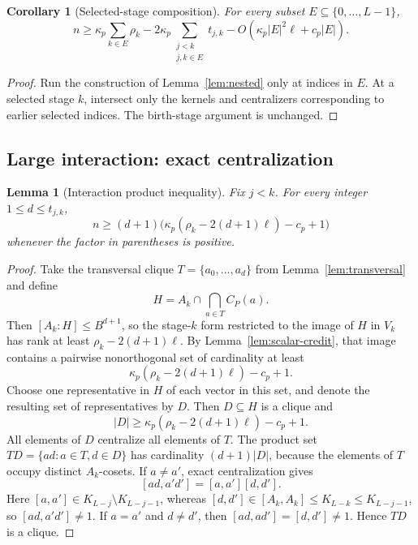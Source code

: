\documentclass[11pt]{article}
\newtheorem{lemma}[theorem]{Lemma}
\newtheorem{corollary}[theorem]{Corollary}
\theoremstyle{definition}
\theoremstyle{remark}
\begin{document}
\begin{corollary}[Selected-stage composition]\label{cor:selected}
For every subset $E\subseteq\{0,\ldots,L-1\}$,
\[
n\ge\kappa_p\sum_{k\in E}\rho_k-2\kappa_p\!\sum_{\substack{j<k\\ j,k\in E}}t_{j,k}-O\!\left(\kappa_p|E|^2\ell+c_p|E|\right).
\]
\end{corollary}

\begin{proof}
Run the construction of Lemma~\ref{lem:nested} only at indices in $E$. At a selected stage $k$, intersect only the kernels and centralizers corresponding to earlier selected indices. The birth-stage argument is unchanged.
\end{proof}

\subsection{Large interaction: exact centralization}

\begin{lemma}[Interaction product inequality]\label{lem:product}
Fix $j<k$. For every integer $1\le d\le t_{j,k}$,
\[
n\ge(d+1)\bigl(\kappa_p(\rho_k-2(d+1)\ell)-c_p+1\bigr)
\]
whenever the factor in parentheses is positive.
\end{lemma}

\begin{proof}
Take the transversal clique $T=\{a_0,\ldots,a_d\}$ from Lemma~\ref{lem:transversal} and define
\[
H=A_k\cap\bigcap_{a\in T}C_P(a).
\]
Then $[A_k:H]\le B^{d+1}$, so the stage-$k$ form restricted to the image of $H$ in $V_k$ has rank at least $\rho_k-2(d+1)\ell$. By Lemma~\ref{lem:scalar-credit}, that image contains a pairwise nonorthogonal set of cardinality at least
\[
\kappa_p(\rho_k-2(d+1)\ell)-c_p+1.
\]
Choose one representative in $H$ of each vector in this set, and denote the resulting set of representatives by $D$. Then $D\subseteq H$ is a clique and
\[
|D|\ge\kappa_p(\rho_k-2(d+1)\ell)-c_p+1.
\]
All elements of $D$ centralize all elements of $T$. The product set $TD=\{ad:a\in T,d\in D\}$ has cardinality $(d+1)|D|$, because the elements of $T$ occupy distinct $A_k$-cosets. If $a\ne a'$, exact centralization gives
\[
[ad,a'd']=[a,a'][d,d'].
\]
Here $[a,a']\in K_{L-j}\setminus K_{L-j-1}$, whereas $[d,d']\in[A_k,A_k]\le K_{L-k}\le K_{L-j-1}$, so $[ad,a'd']\ne1$. If $a=a'$ and $d\ne d'$, then $[ad,ad']=[d,d']\ne1$. Hence $TD$ is a clique.
\end{proof}
\end{document}
